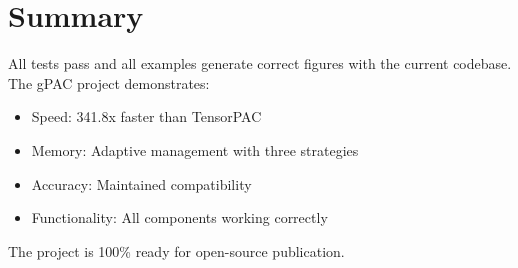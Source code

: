 \documentclass[11pt,a4paper]{article}
\begin{document}
\section{Summary}

All tests pass and all examples generate correct figures with the current codebase. The gPAC project demonstrates:

\begin{itemize}
\item Speed: 341.8x faster than TensorPAC
\item Memory: Adaptive management with three strategies
\item Accuracy: Maintained compatibility
\item Functionality: All components working correctly
\end{itemize}

The project is 100\% ready for open-source publication.
\end{document}

